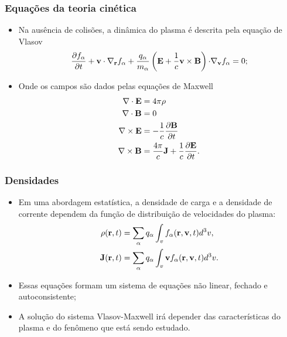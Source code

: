 \documentclass[10pt,aspectratio=1610,lualatex]{beamer}
\begin{document}
\begin{frame}
  \frametitle{Equações da teoria cinética}
  \begin{itemize}
    \item Na  ausência de  colisões, a dinâmica  do plasma  é descrita
    pela equação de Vlasov
    \begin{equation*}
      \frac{\partial f_\alpha}{\partial t}
      +{\bf v \cdot \nabla_r}f_\alpha
      +\frac{q_\alpha}{m_\alpha}
      \left({\bf E}+\frac{1}{c}{\bf v}\times {\bf B} \right)
      {\bf \cdot \nabla_v}f_\alpha=0;
    \end{equation*}
    \pause
    \vspace{0.3cm}
    \item Onde os campos são dados pelas equações de Maxwell
    \begin{equation*}
      \begin{split}
	{\bf \nabla \cdot E}&= 4\pi\rho\\
	{\bf \nabla \cdot B}&= 0\\
	{\bf \nabla \times E}&= -\frac{1}{c}
	\frac{\partial{\bf B}}{\partial t}\\
	{\bf \nabla \times B}&=\frac{4\pi}{c}{\bf J}
	+\frac{1}{c}\frac{\partial{\bf E}}{\partial t}.
      \end{split}
    \end{equation*} 
  \end{itemize}
\end{frame}

\begin{frame}
  \frametitle{Densidades}
  \begin{itemize}
    \item Em uma abordagem estatística, a densidade de carga e a
    densidade de corrente dependem da função de distribuição de
    velocidades do plasma:
    \begin{displaymath}
      \begin{split}
        \rho({\bf r},t)&
        =\sum_\alpha q_{\alpha}\int_v f_\alpha({\bf r},{\bf v},t)d^3v,\\
        {\bf J}({\bf r},t)&= \sum_\alpha q_\alpha\int_v{\bf v}
         f_\alpha({\bf r},{\bf v},t) d^3v.
      \end{split}
    \end{displaymath}
    \pause
    \item Essas equações formam um sistema de equações não linear,
    fechado e autoconsistente;
    \pause
    \vspace{0.2cm}
    \item A solução do sistema Vlasov-Maxwell irá depender das características
    do plasma e do fenômeno que está sendo estudado.
  \end{itemize}
\end{frame}
\end{document}
